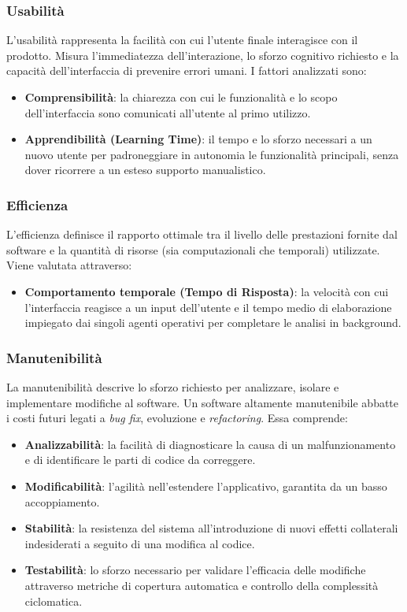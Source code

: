 \documentclass[12pt, a4paper]{article}
\begin{document}
\subsubsection{Usabilità}
L'usabilità rappresenta la facilità con cui l'utente finale interagisce con il prodotto. Misura l'immediatezza dell'interazione, lo sforzo cognitivo richiesto e la capacità dell'interfaccia di prevenire errori umani. I fattori analizzati sono:
\begin{itemize}
    \item \textbf{Comprensibilità}: la chiarezza con cui le funzionalità e lo scopo dell'interfaccia sono comunicati all'utente al primo utilizzo.
    \item \textbf{Apprendibilità (Learning Time)}: il tempo e lo sforzo necessari a un nuovo utente per padroneggiare in autonomia le funzionalità principali, senza dover ricorrere a un esteso supporto manualistico.
\end{itemize}

\subsubsection{Efficienza}
L'efficienza definisce il rapporto ottimale tra il livello delle prestazioni fornite dal software e la quantità di risorse (sia computazionali che temporali) utilizzate. Viene valutata attraverso:
\begin{itemize}
    \item \textbf{Comportamento temporale (Tempo di Risposta)}: la velocità con cui l'interfaccia reagisce a un input dell'utente e il tempo medio di elaborazione impiegato dai singoli agenti operativi per completare le analisi in background.
\end{itemize}

\subsubsection{Manutenibilità}
La manutenibilità descrive lo sforzo richiesto per analizzare, isolare e implementare modifiche al software. Un software altamente manutenibile abbatte i costi futuri legati a \textit{bug fix}, evoluzione e \textit{refactoring}. Essa comprende:
\begin{itemize}
    \item \textbf{Analizzabilità}: la facilità di diagnosticare la causa di un malfunzionamento e di identificare le parti di codice da correggere.
    \item \textbf{Modificabilità}: l'agilità nell'estendere l'applicativo, garantita da un basso accoppiamento.
    \item \textbf{Stabilità}: la resistenza del sistema all'introduzione di nuovi effetti collaterali indesiderati a seguito di una modifica al codice.
    \item \textbf{Testabilità}: lo sforzo necessario per validare l'efficacia delle modifiche attraverso metriche di copertura automatica e controllo della complessità ciclomatica.
\end{itemize}
\end{document}
